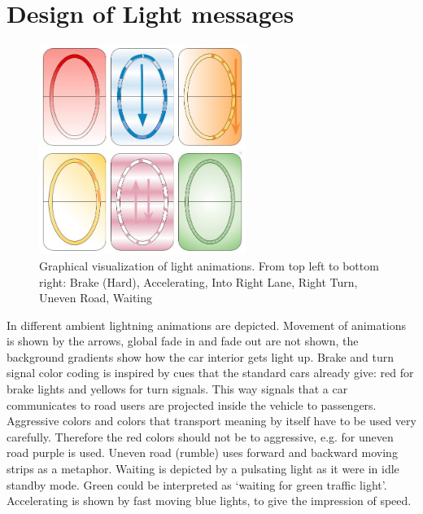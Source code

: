 \section{Design of Light messages}
\begin{figure}
    \includegraphics[width=0.6\textwidth]{fig/lightsignals.JPG}
    \caption[Light animations]{Graphical visualization of light animations. From top left to bottom right:
Brake (Hard), Accelerating, Into Right Lane, Right Turn, Uneven Road, Waiting}
    \label{fig:lightanimations}
\end{figure}
In  different ambient lightning animations are depicted. Movement of animations is shown by the arrows, global fade in and fade out are not shown, the background gradients show how the car interior gets light up. Brake and turn signal color coding is inspired by cues that the standard cars already give: red for brake lights and yellows for turn signals. This way signals that a car communicates to road users are projected inside the vehicle to passengers. Aggressive colors and colors that transport meaning by itself have to be used very carefully. Therefore the red colors should not be to aggressive, e.g. for uneven road purple is used. Uneven road (rumble) uses forward and backward moving strips as a metaphor. Waiting is depicted by a pulsating light as it were in idle standby mode. Green could be interpreted as ‘waiting for green traffic light’. Accelerating is shown by fast moving blue lights, to give the impression of speed.